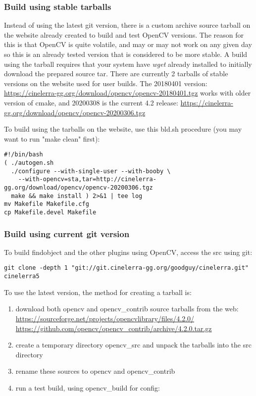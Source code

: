 \subsubsection*{Build using stable tarballs}%
\label{ssub:stable_tars}

Instead of using the latest git version, there is a custom archive source tarball on the
website already created to build and test OpenCV versions.  The reason for this is that OpenCV
is quite volatile, and may or may not work on any given day so this is an already tested version
that is considered to be more stable.  A build using the tarball requires that your
system have \textit{wget} already installed to initially download the prepared source tar. 
There are currently 2 tarballs of stable versions on the website used for user builds.
The 20180401 version:\newline
{\small \url{ https://cinelerra-gg.org/download/opencv/opencv-20180401.tgz}}\newline
works with older version of cmake, and 20200308 is the current 4.2 release:\newline
{\small \url{https://cinelerra-gg.org/download/opencv/opencv-20200306.tgz}}

To build using the tarballs on the website, use this bld.sh procedure (you may want to run "make
clean" first):
\begin{lstlisting}[style=sh]
#!/bin/bash
( ./autogen.sh
  ./configure --with-single-user --with-booby \
    --with-opencv=sta,tar=http://cinelerra-gg.org/download/opencv/opencv-20200306.tgz
  make && make install ) 2>&1 | tee log
mv Makefile Makefile.cfg
cp Makefile.devel Makefile
\end{lstlisting}

\subsubsection*{Build using current git version}%
\label{ssub:current_git}

To build findobject and the other plugins using OpenCV, access the src using git:

\begin{lstlisting}[style=sh]
git clone -depth 1 "git://git.cinelerra-gg.org/goodguy/cinelerra.git" cinelerra5
\end{lstlisting}
To use the latest version, the method for creating a tarball is:
 
\begin{enumerate}
     \item download both opencv and opencv\_contrib source tarballs from the web:
       {\small \url{https://sourceforge.net/projects/opencvlibrary/files/4.2.0/}}
       {\small \url{https://github.com/opencv/opencv\_contrib/archive/4.2.0.tar.gz}}
     \item create a temporary directory opencv\_src and unpack the tarballs into the src directory
     \item rename these sources to opencv and opencv\_contrib
     \item run a test build, using opencv\_build for config:
\end{enumerate}

